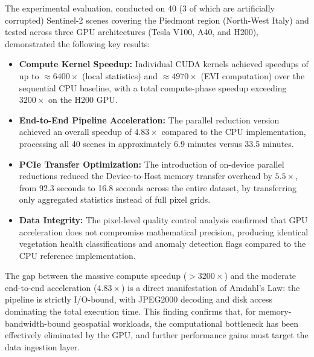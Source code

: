 \documentclass[10pt,conference,compsoc]{IEEEtran}
\begin{document}
The experimental evaluation, conducted on 40 (3 of which are artificially corrupted) Sentinel-2 scenes covering the Piedmont region (North-West Italy) and tested across three GPU architectures (Tesla V100, A40, and H200), demonstrated the following key results:
\begin{itemize}
    \item \textbf{Compute Kernel Speedup:} Individual CUDA kernels achieved speedups of up to $\approx 6400\times$ (local statistics) and $\approx 4970\times$ (EVI computation) over the sequential CPU baseline, with a total compute-phase speedup exceeding $3200\times$ on the H200 GPU.
    \item \textbf{End-to-End Pipeline Acceleration:} The parallel reduction version achieved an overall speedup of $4.83\times$ compared to the CPU implementation, processing all 40 scenes in approximately 6.9 minutes versus 33.5 minutes.
    \item \textbf{PCIe Transfer Optimization:} The introduction of on-device parallel reductions reduced the Device-to-Host memory transfer overhead by $5.5\times$, from 92.3 seconds to 16.8 seconds across the entire dataset, by transferring only aggregated statistics instead of full pixel grids.
    \item \textbf{Data Integrity:} The pixel-level quality control analysis confirmed that GPU acceleration does not compromise mathematical precision, producing identical vegetation health classifications and anomaly detection flags compared to the CPU reference implementation.
\end{itemize}

The gap between the massive compute speedup ($>3200\times$) and the moderate end-to-end acceleration ($4.83\times$) is a direct manifestation of Amdahl's Law: the pipeline is strictly I/O-bound, with JPEG2000 decoding and disk access dominating the total execution time. This finding confirms that, for memory-bandwidth-bound geospatial workloads, the computational bottleneck has been effectively eliminated by the GPU, and further performance gains must target the data ingestion layer.
\end{document}
